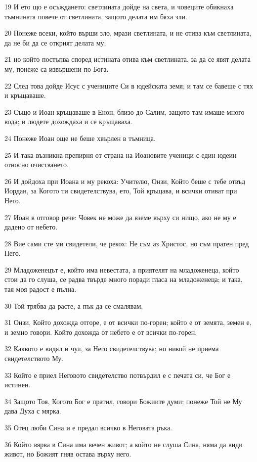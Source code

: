 \par 19 И ето що е осъждането: светлината дойде на света, и човеците обикнаха тъмнината повече от светлината, защото делата им бяха зли.
\par 20 Понеже всеки, който върши зло, мрази светлината, и не отива към светлината, да не би да се открият делата му;
\par 21 но който постъпва според истината отива към светлината, за да се явят делата му, понеже са извършени по Бога.
\par 22 След това дойде Исус с учениците Си в юдейската земя; и там се бавеше с тях и кръщаваше.
\par 23 Също и Иоан кръщаваше в Енон, близо до Салим, защото там имаше много вода; и людете дохождаха и се кръщаваха.
\par 24 Понеже Иоан още не беше хвърлен в тъмница.
\par 25 И така възникна препирня от страна на Иоановите ученици с един юдеин относно очистването.
\par 26 И дойдоха при Иоана и му рекоха: Учителю, Онзи, Който беше с тебе отвъд Иордан, за Когото ти свидетелствува, ето, Той кръщава, и всички отиват при Него.
\par 27 Иоан в отговор рече: Човек не може да вземе върху си нищо, ако не му е дадено от небето.
\par 28 Вие сами сте ми свидетели, че рекох: Не съм аз Христос, но съм пратен пред Него.
\par 29 Младоженецът е, който има невестата, а приятелят на младоженеца, който стои да го слуша, се радва твърде много поради гласа на младоженеца; и така, тая моя радост е пълна.
\par 30 Той трябва да расте, а пък да се смалявам‚
\par 31 Онзи, Който дохожда отгоре, е от всички по-горен; който е от земята, земен е, и земно говори. Който дохожда от небето е от всички по-горен.
\par 32 Каквото е видял и чул, за Него свидетелствува; но никой не приема свидетелството Му.
\par 33 Който е приел Неговото свидетелство потвърдил е с печата си, че Бог е истинен.
\par 34 Защото Тоя, Когото Бог е пратил, говори Божиите думи; понеже Той не Му дава Духа с мярка.
\par 35 Отец люби Сина и е предал всичко в Неговата ръка.
\par 36 Който вярва в Сина има вечен живот; а който не слуша Сина, няма да види живот, но Божият гняв остава върху него.


